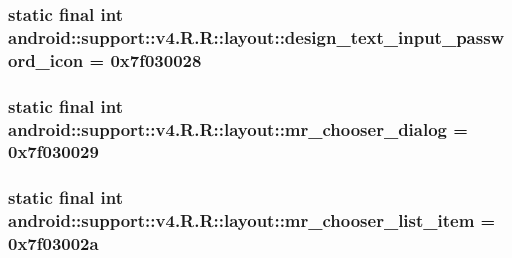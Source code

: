 \hypertarget{classandroid_1_1support_1_1v4_1_1_r_1_1layout_fcba7aada330ce4fd58be2bbc787b84b}{
\subsubsection[{design\_\-text\_\-input\_\-password\_\-icon}]{\setlength{\rightskip}{0pt plus 5cm}static final int android::support::v4.R.R::layout::design\_\-text\_\-input\_\-password\_\-icon = 0x7f030028}}
\label{classandroid_1_1support_1_1v4_1_1_r_1_1layout_fcba7aada330ce4fd58be2bbc787b84b}


\hypertarget{classandroid_1_1support_1_1v4_1_1_r_1_1layout_257fe028861b429fc7a1b6c672424f51}{
\subsubsection[{mr\_\-chooser\_\-dialog}]{\setlength{\rightskip}{0pt plus 5cm}static final int android::support::v4.R.R::layout::mr\_\-chooser\_\-dialog = 0x7f030029}}
\label{classandroid_1_1support_1_1v4_1_1_r_1_1layout_257fe028861b429fc7a1b6c672424f51}


\hypertarget{classandroid_1_1support_1_1v4_1_1_r_1_1layout_75114b51f2cef307602ae8e683c1493c}{
\subsubsection[{mr\_\-chooser\_\-list\_\-item}]{\setlength{\rightskip}{0pt plus 5cm}static final int android::support::v4.R.R::layout::mr\_\-chooser\_\-list\_\-item = 0x7f03002a}}
\label{classandroid_1_1support_1_1v4_1_1_r_1_1layout_75114b51f2cef307602ae8e683c1493c}


